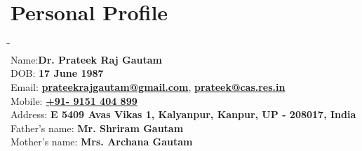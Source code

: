 \vspace{-2em}
\section{Personal Profile}
\vspace{-2.5em}
\begin{tabbing}
\=\hspace{7em}\= \kill \\
\>Name:\>\textbf{{Dr. Prateek Raj Gautam}} \\
\>DOB: \>\textbf{{17 June 1987}}\\ 
\>Email: \>\textbf{{\href{mailto:prateekrajgautam@gmail.com}{prateekrajgautam@gmail.com}}},  \textbf{{\href{mailto:prateek@cas.res.in}{prateek@cas.res.in}}} \\
\>Mobile: \>\textbf{{\href{https://t.me/prateekrajgautam}{+91- 9151 404 899}}}\\
\>Address: \>\textbf{{E 540\/9 Avas Vikas 1, Kalyanpur, Kanpur, UP - 208017, India}}\\
\>Father’s name: \>\textbf{{Mr. Shriram Gautam}} \\
\>Mother’s name: \>\textbf{{Mrs. Archana Gautam}}
\end{tabbing}
\vspace{-2em}
\sectionline